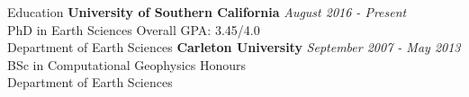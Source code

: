 \begin{rSection}{Education}
    {\bf University of Southern California} \hfill {\em August 2016 - Present} \\
    PhD in Earth Sciences \hfill { Overall GPA: 3.45/4.0} \\
    Department of Earth Sciences
    \smallbreak
    {\bf Carleton University} \hfill {\em September 2007 - May 2013} \\
    BSc in Computational Geophysics \hfill {Honours} \\
    Department of Earth Sciences  
\end{rSection}